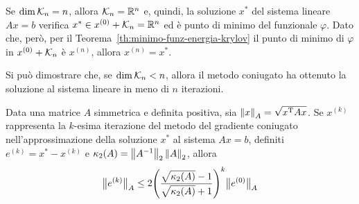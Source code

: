 	\begin{osservazione}
		Se \(\dim \mathcal{K}_n = n\), allora \(\mathcal{K}_n = \mathbb{R}^n\) e, quindi, la soluzione \(x^*\) del sistema lineare \(A x = b\) verifica \(x^* \in x^{(0)} + \mathcal{K}_n = \mathbb{R}^n\) ed è punto di minimo del funzionale \(\varphi\). Dato che, però, per il Teorema~\ref{th:minimo-funz-energia-krylov} il punto di minimo di \(\varphi\) in \(x^{(0)} + \mathcal{K}_n\) è \(x^{(n)}\), allora \(x^{(n)} = x^*\).
		
		Si può dimostrare che, se \(\dim \mathcal{K}_n < n\), allora il metodo coniugato ha ottenuto la soluzione al sistema lineare in meno di \(n\) iterazioni.
	\end{osservazione}

	\begin{teorema}\label{th:errore-metodo-gradiente-coniugato}
		Data una matrice \(A\) simmetrica e definita positiva, sia \(\norm{x}_A = \sqrt{x^\mathrm{T}\relax A x}\). Se \(x^{(k)}\) rappresenta la \(k\)-esima iterazione del metodo del gradiente coniugato nell'approssimazione della soluzione \(x^*\) al sistema \(A x = b\), definiti \(e^{(k)} = x^* - x^{(k)}\) e \(\kappa_2 (A) = \norm{A^{-1}}_2 \, \norm{A}_2\), allora
		\begin{equation}
			\bigl\| e^{(k)} \bigr\|_A \le 2 \qty(\frac{\sqrt{\kappa_2 (A)} - 1}{\sqrt{\kappa_2 (A)} + 1})^k \bigl\| e^{(0)} \bigr\|_A
		\end{equation}
	\end{teorema}

